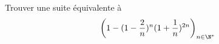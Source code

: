 Trouver une suite \'equivalente \`a
\[\left(1-(1-\dfrac{2}{n})^n(1+\dfrac{1}{n})^{2n} \right)_{n\in\N^*}\]
\bigskip